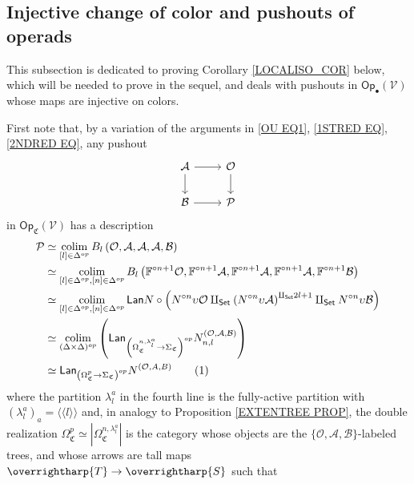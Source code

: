 \documentclass[a4paper,10pt
]{article}%
\numberwithin{equation}{section}
\numberwithin{figure}{section}
\theoremstyle{definition} %
\newcommand{\vect}[1]{\text{\overrightharp{\ensuremath{#1}}}}
\DeclareMathOperator{\colim}{colim}%
\newcommand{\V}{\ensuremath{\mathcal V}}
\renewcommand{\O}{\ensuremath{\mathcal O}}
\newcommand{\1}{\ensuremath{\mathbbm 1}}%
\newcommand{\OC}{\Omega_{\mathfrak C}}
\begin{document}
\subsection{Injective change of color and pushouts of operads}
\label{INJCOLCH AP}

This subsection is dedicated to proving
Corollary \ref{LOCALISO_COR} below,
which will be needed 
to prove \cite[Prop. \ref{AC-J_CELL_PROP}]{BP_ACOP} in the sequel,
and deals with pushouts in 
$\mathsf{Op}_{\bullet}(\V)$
whose maps are injective on colors.


First note that, by a variation of the arguments in \eqref{OU EQ1}, \eqref{1STRED EQ}, \eqref{2NDRED EQ},
any pushout 
\[
\begin{tikzcd}
\mathcal{A} \ar{r} \ar{d} & \mathcal{O} \ar{d}
\\
\mathcal{B} \ar{r} & \mathcal{P}
\end{tikzcd}
\]
in $\mathsf{Op}_{\mathfrak{C}}(\V) $ has a description
\begin{align*}
\mathcal{P}
&
\simeq \colim_{[l] \in \Delta^{op}} 
B_l \left( \O, \mathcal{A}, \mathcal{A}, \mathcal{A}, \mathcal{B} \right)
\\
&
\simeq \colim_{[l] \in \Delta^{op},[n] \in \Delta^{op}} 
B_l \left( 
\mathbb F^{\circ n+1} \O, 
\mathbb F^{\circ n+1} \mathcal{A}, 
\mathbb F^{\circ n+1} \mathcal{A}, 
\mathbb F^{\circ n+1} \mathcal{A}, 
\mathbb F^{\circ n+1} \mathcal{B} \right)
\\
&
\simeq \colim_{[l] \in \Delta^{op},[n] \in \Delta^{op}} 
\mathsf{Lan} N \circ \left( N^{\circ n} \upsilon \O 
\amalg_{\mathsf{Set}}
\left( N^{\circ n} \upsilon \mathcal{A}\right)^{\amalg_{\mathsf{Set}} 2l +1}
\amalg_{\mathsf{Set}}
N^{\circ n} \upsilon \mathcal{B} \right)
\\
&	
\simeq
\mathop{\colim}\limits_{(\Delta \times \Delta)^{op}}
\left(
\mathsf{Lan}_{\left(\Omega_{\mathfrak C}^{n,\lambda^a_l} \to \Sigma_{\mathfrak C}\right)^{op}} N_{n,l}^{(\O,\mathcal{A},\mathcal{B})}
\right)
\\
&	
\simeq
\mathsf{Lan}_{\left(\Omega_{\mathfrak C}^{p} \to
	\Sigma_{\mathfrak C}\right)^{op}} N^{(\O,A,B)}
\stepcounter{equation}\tag{\theequation}\label{OU EQ2}
\end{align*}
where the partition $\lambda^a_l$ in the fourth line is the fully-active partition with $\left(\lambda^a_l\right)_a = \langle \langle l \rangle \rangle$
and, in analogy to Proposition \ref{EXTENTREE PROP},
the double realization
$\OC^p \simeq |\Omega_{\mathfrak C}^{n,\lambda^a_l}|$
is the category whose objects are the
$\{\mathcal{O},\mathcal{A},\mathcal{B}\}$-labeled trees,
and whose arrows are tall maps $\vect{T} \to \vect{S}$ such that
\end{document}
